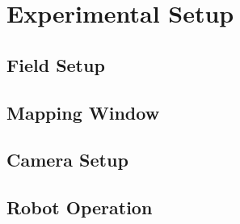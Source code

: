 
\cleardoublepage

\chapter{Experimental Setup}
\label{experiment}


\section{Field Setup}
\label{experiment-field}


\section{Mapping Window}



\section{Camera Setup}



\section{Robot Operation}




